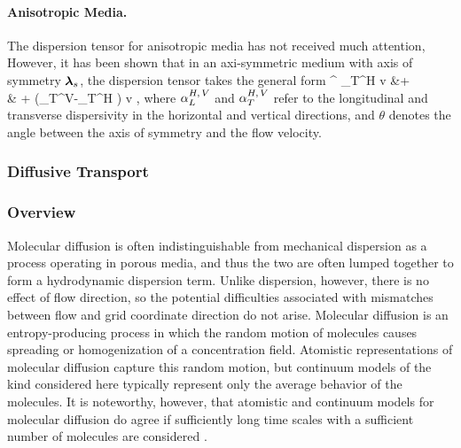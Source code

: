\paragraph{Anisotropic Media.}

The dispersion tensor for anisotropic media has not received much attention,  However, it has been shown that in an axi-symmetric medium with axis of symmetry $\boldsymbol{\lambda}_s$, the dispersion tensor takes the general form \citep{lichtner_2002}
\BA     \label{gendisp}
\bD^{} \eq \a_T^H v \bI &+   \nonumber\\
& + \left(\a_T^V-\a_T^H \right) v ,
\EA
where ${\alpha}_L^{H,\,V}$ and ${\alpha}_T^{H,\,V}$ refer to the longitudinal and transverse dispersivity in the horizontal and vertical directions, and $\theta$ denotes the angle between the axis of symmetry and the flow velocity.




\subsubsection{Diffusive Transport} 
\label{sec:diffusive-transport}



\subsubsection{Overview}

\noindent Molecular diffusion is often indistinguishable from mechanical dispersion as a process operating in porous media, and thus the two are often lumped together to form a hydrodynamic dispersion term.  Unlike dispersion, however, there is no effect of flow direction, so the potential difficulties associated with mismatches between flow and grid coordinate direction do not arise.  Molecular diffusion is an entropy-producing process in which the random motion of molecules causes spreading or homogenization of a concentration field.  Atomistic representations of molecular diffusion capture this random motion, but continuum models of the kind considered here typically represent only the average behavior of the molecules.  It is noteworthy, however, that atomistic and continuum models for molecular diffusion do agree if sufficiently long time scales with a sufficient number of molecules are considered \citep{bourg2008modeling}.

